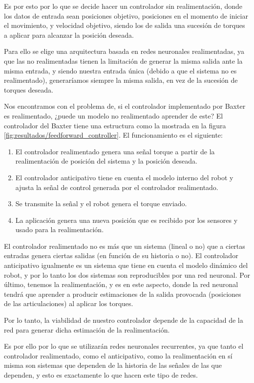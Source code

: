 Es por esto por lo que se decide hacer un controlador sin realimentación, donde los datos de entrada sean posiciones objetivo, posiciones en el momento de iniciar el movimiento, y velocidad objetivo, siendo los de salida una sucesión de torques a aplicar para alcanzar la posición deseada.

Para ello se elige una arquitectura basada en redes neuronales realimentadas, ya que las no realimentadas tienen la limitación de generar la misma salida ante la misma entrada, y siendo nuestra entrada única (debido a que el sistema no es realimentado), generaríamos siempre la misma salida, en vez de la sucesión de torques deseada.

Nos encontramos con el problema de, si el controlador implementado por Baxter es realimentado, ¿puede un modelo no realimentado aprender de este? %
El controlador del Baxter tiene una estructura como la mostrada en la figura \ref{fig:resultados/feedforward_controller}. El funcionamiento es el siguiente:

\begin{enumerate}
\item El controlador realimentado genera una señal torque a partir de la realimentación de posición del sistema y la posición deseada.
\item El controlador anticipativo tiene en cuenta el modelo interno del robot y ajusta la señal de control generada por el controlador realimentado.
\item Se transmite la señal y el robot genera el torque enviado.
\item La aplicación genera una nueva posición que es recibido por los sensores y usado para la realimentación.
\end{enumerate}

El controlador realimentado no es más que un sistema (lineal o no) que a ciertas entradas genera ciertas salidas (en función de su historia o no). El controlador anticipativo igualmente es un sistema que tiene en cuenta el modelo dinámico del robot, y por lo tanto los dos sistemas son reproducibles por una red neuronal. Por último, tenemos la realimentación, y es en este aspecto, donde la red neuronal tendrá que aprender a producir estimaciones de la salida provocada (posiciones de las articulaciones) al aplicar los torques.

Por lo tanto, la viabilidad de nuestro controlador depende de la capacidad de la red para generar dicha estimación de la realimentación.

Es por ello por lo que se utilizarán redes neuronales recurrentes, ya que tanto el controlador realimentado, como el anticipativo, como la realimentación en sí misma son sistemas que dependen de la historia de las señales de las que dependen, y esto es exactamente lo que hacen este tipo de redes.

